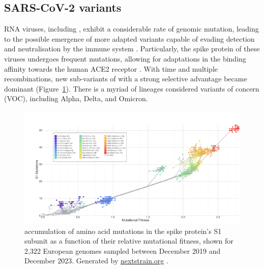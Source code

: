 \subsection{SARS-CoV-2 variants}

RNA viruses, including \sars, exhibit a considerable rate of genomic mutation, leading to the possible emergence of more adapted variants capable of evading detection and neutralisation by the immune system \citep{markov2023EvolutionSARSCoV2}.
Particularly, the spike protein of these viruses undergoes frequent mutations, allowing for adaptations in the binding affinity towards the human ACE2 receptor \citep{singh2021OriginEvolution}.
With time and multiple recombinations, new sub-variants of \covid with a strong selective advantage became dominant (Figure~\ref{fig:sars-mutations}).
There is a myriad of \sars lineages considered variants of concern (VOC), including Alpha, Delta, and Omicron.


\begin{figure}[h]
    \centering
    \includegraphics[width=\textwidth]{chapter/introduction/figures/nextstrain_ncov_gisaid_europe_all-time.png}
    \caption[\sars accumulation of amino acid mutations in the spike protein's S1 subunit as a function of their relative mutational fitness]{\sars accumulation of amino acid mutations in the spike protein's S1 subunit as a function of their relative mutational fitness, shown for 2,322 European genomes sampled between December 2019 and December 2023. Generated by \href{https://nextstrain.org/}{nextstrain.org} \citet{hadfield2018NextstrainRealtime}.}
    \label{fig:sars-mutations}
\end{figure}



